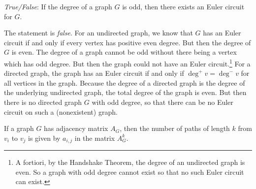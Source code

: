 \documentclass[11pt,letterpaper]{article}
\begin{document}
\quizsol \textit{True/False}: If the degree of a graph $G$ is odd, then there exists an Euler circuit for $G$. \pspace

\sol The statement is \textit{false}. For an undirected graph, we know that $G$ has an Euler circuit if and only if every vertex has positive even degree. But then the degree of $G$ is even. The degree of a graph cannot be odd without there being a vertex which has odd degree. But then the graph could not have an Euler circuit.\footnote{A fortiori, by the Handshake Theorem, the degree of an undirected graph is even. So a graph with odd degree cannot exist so that no such Euler circuit can exist.} For a directed graph, the graph has an Euler circuit if and only if $\deg^+ v= \deg^- v$ for all vertices in the graph. Because the degree of a directed graph is the degree of the underlying undirected graph, the total degree of the graph is even. But then there is no directed graph $G$ with odd degree, so that there can be no Euler circuit on such a (nonexistent) graph. 




If a graph $G$ has adjacency matrix $A_G$, then the number of paths of length $k$ from $v_i$ to $v_j$ is given by $a_{i,j}$ in the matrix $A_G^k$.
\end{document}
